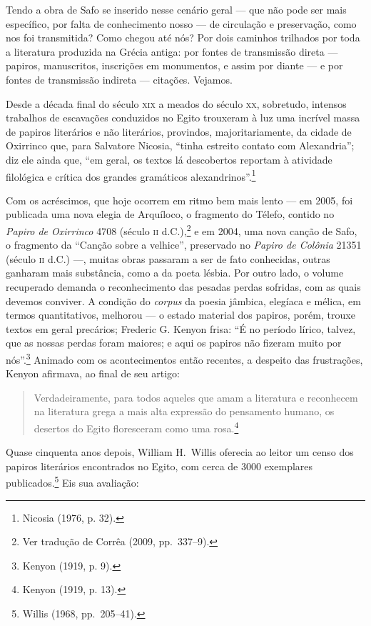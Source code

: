 Tendo a obra de Safo se inserido nesse cenário geral --- que não pode ser mais
específico, por falta de conhecimento nosso --- de circulação e
preservação, como nos foi transmitida? Como chegou até nós? Por dois caminhos
trilhados por toda a literatura produzida na Grécia antiga: por fontes de
transmissão direta --- papiros, manuscritos, inscrições em monumentos, e assim
por diante --- e por fontes de transmissão indireta --- citações. Vejamos. 

Desde a década final do século \textsc{xix} a meados do século \textsc{xx}, sobretudo,
intensos trabalhos de escavações conduzidos no Egito trouxeram à luz uma
incrível massa de papiros literários e não literários, provindos,
majoritariamente, da cidade de Oxirrinco que, para Salvatore Nicosia, “tinha
estreito contato com Alexandria”; diz ele ainda que, “em geral, os
textos lá descobertos reportam à atividade filológica e crítica dos grandes
gramáticos alexandrinos”.\footnote{ Nicosia (1976, p. 32).}

Com os acréscimos, que hoje ocorrem em ritmo bem mais lento --- em 2005, foi
publicada uma nova elegia de Arquíloco, o fragmento do Télefo, contido no
\textit{Papiro de Oxirrinco} 4708 (século \textsc{ii} d.C.),\footnote{ Ver tradução de
Corrêa (2009, pp.~337--9).} e em 2004, uma nova canção de Safo, o fragmento da
``Canção sobre a velhice'', preservado no \textit{Papiro de Colônia} 21351 (século \textsc{ii} d.C.) ---,
muitas obras passaram a ser de fato conhecidas, outras ganharam mais
substância, como a da poeta lésbia. Por outro lado, o volume recuperado demanda
o reconhecimento das pesadas perdas sofridas, com as quais devemos conviver. A
condição do \textit{corpus} da poesia jâmbica, elegíaca e mélica, em termos
quantitativos, melhorou --- o estado material dos papiros, porém, trouxe textos
em geral precários; Frederic G. Kenyon frisa:
“É no período lírico, talvez, que as nossas perdas foram maiores; e aqui os
papiros não fizeram muito por nós”.\footnote{ Kenyon (1919, p. 9).} Animado com os acontecimentos então
recentes, a despeito das frustrações, Kenyon afirmava, ao final de seu
artigo: 

\begin{quote}
Verdadeiramente, para todos aqueles que amam a literatura e reconhecem
na literatura grega a mais alta expressão do pensamento humano, os desertos do
Egito floresceram como uma rosa.\footnote{ Kenyon (1919, p. 13).}
\end{quote}


Quase cinquenta anos depois, William H.~Willis oferecia ao
leitor um censo dos papiros literários encontrados no Egito, com cerca de 3000
exemplares publicados.\footnote{ Willis (1968, pp.~205--41).} Eis sua avaliação: 

